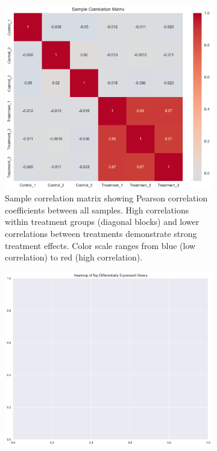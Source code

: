 \documentclass[11pt,a4paper]{article}
\begin{document}
\begin{figure}[H]
    \centering
    \begin{subfigure}[b]{0.48\textwidth}
        \includegraphics[width=\textwidth]{figures/sample_correlation.png}
        \caption{Sample correlation matrix showing Pearson correlation coefficients between all samples. High correlations within treatment groups (diagonal blocks) and lower correlations between treatments demonstrate strong treatment effects. Color scale ranges from blue (low correlation) to red (high correlation).}
        \label{fig:sample_corr}
    \end{subfigure}
    \hfill
    \begin{subfigure}[b]{0.48\textwidth}
        \includegraphics[width=\textwidth]{figures/de_heatmap.png}

\end{subfigure}
\end{figure}
\end{document}
